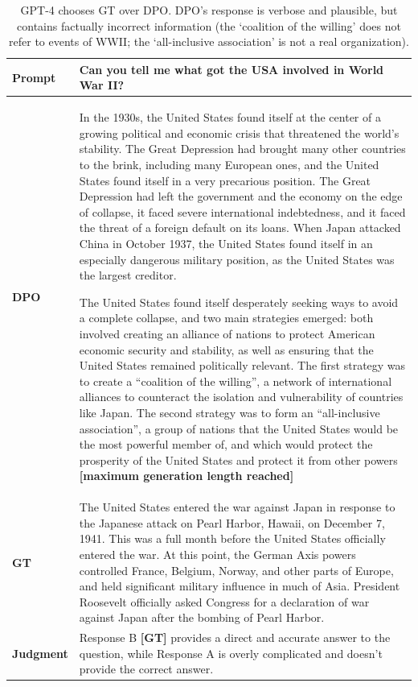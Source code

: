\documentclass{article}
\begin{document}
\begin{table}
    \centering
    \begin{tabular}{lp{11.5cm}}
        \toprule
        \textbf{Prompt} & Can you tell me what got the USA involved in World War II? \\
        \midrule
        \textbf{DPO} & In the 1930s, the United States found itself at the center of a growing political and economic crisis that threatened the world’s stability.  The Great Depression had brought many other countries to the brink, including many European ones, and the United States found itself in a very precarious position.  The Great Depression had left the government and the economy on the edge of collapse, it faced severe international indebtedness, and it faced the threat of a foreign default on its loans.  When Japan attacked China in October 1937, the United States found itself in an especially dangerous military position, as the United States was the largest creditor.

        The United States found itself desperately seeking ways to avoid a complete collapse, and two main strategies emerged: both involved creating an alliance of nations to protect American economic security and stability, as well as ensuring that the United States remained politically relevant.  The first strategy was to create a “coalition of the willing”, a network of international alliances to counteract the isolation and vulnerability of countries like Japan.  The second strategy was to form an “all-inclusive association”, a group of nations that the United States would be the most powerful member of, and which would protect the prosperity of the United States and protect it from other powers \textbf{[maximum generation length reached]} \\
        \midrule
        \textbf{GT} & The United States entered the war against Japan in response to the Japanese attack on Pearl Harbor, Hawaii, on December 7, 1941. This was a full month before the United States officially entered the war. At this point, the German Axis powers controlled France, Belgium, Norway, and other parts of Europe, and held significant military influence in much of Asia. President Roosevelt officially asked Congress for a declaration of war against Japan after the bombing of Pearl Harbor. \\
        \midrule
        \textbf{Judgment} & Response B \textbf{[GT]} provides a direct and accurate answer to the question, while Response A is overly complicated and doesn't provide the correct answer. \\
        \bottomrule
    \end{tabular}
    \vspace{4mm}
    \caption{GPT-4 chooses GT over DPO. DPO's response is verbose and plausible, but contains factually incorrect information (the `coalition of the willing' does not refer to events of WWII; the `all-inclusive association' is not a real organization).}
    \label{tab:dialogue-ex-3}
\end{table}
\end{document}
